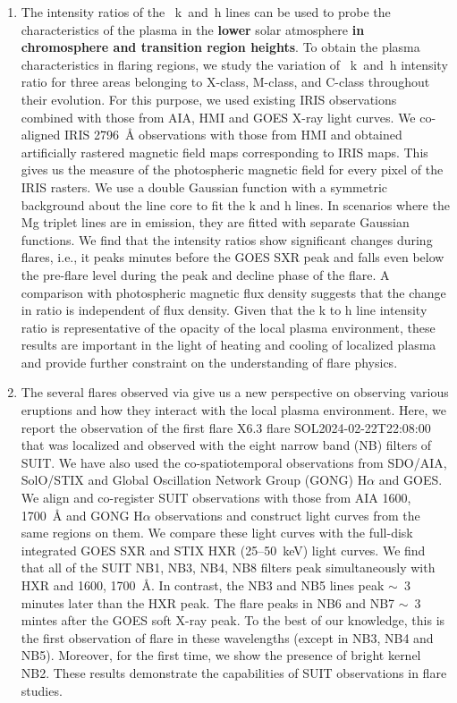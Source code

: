 \begin{enumerate}
    \item The intensity ratios of the ~k~and~h lines can be used to probe the characteristics of the plasma in the {\bf lower} solar atmosphere {\bf in chromosphere and transition region heights}. To obtain the plasma characteristics in flaring regions, we study the variation of ~k~and~h intensity ratio for three areas belonging to X-class, M-class, and C-class throughout their evolution. For this purpose, we used existing IRIS observations combined with those from AIA, HMI and GOES X-ray light curves. We co-aligned IRIS 2796~{\AA} observations with those from HMI and obtained artificially rastered magnetic field maps corresponding to IRIS maps. This gives us the measure of the photospheric magnetic field for every pixel of the IRIS rasters. We use a double Gaussian function with a symmetric background about the line core to fit the  k and h lines. In scenarios where the Mg triplet lines are in emission, they are fitted with separate Gaussian functions. We find that the intensity ratios show significant changes during flares, i.e., it peaks minutes before the GOES SXR peak and falls even below the pre-flare level during the peak and decline phase of the flare. A comparison with photospheric magnetic flux density suggests that the change in ratio is independent of flux density. Given that the  k to h line intensity ratio is representative of the opacity of the local plasma environment, these results are important in the light of heating and cooling of localized plasma and provide further constraint on the understanding of flare physics.

    \item The several flares observed via {\suit} give us a new perspective on observing various eruptions and how they interact with the local plasma environment.  Here, we report the observation of the first flare X6.3 flare SOL2024-02-22T22:08:00 that was localized and observed with the eight narrow band (NB) filters of SUIT. We have also used the co-spatiotemporal observations from SDO/AIA, SolO/STIX and Global Oscillation Network Group (GONG) H$\alpha$ and GOES. We align and co-register SUIT observations with those from AIA 1600, 1700~{\AA} and GONG H$\alpha$ observations and construct light curves from the same regions on them. We compare these light curves with the full-disk integrated GOES SXR and STIX HXR (25{--}50~keV) light curves. We find that all of the SUIT NB1, NB3, NB4, NB8 filters peak simultaneously with HXR and 1600, 1700~{\AA}. In contrast, the NB3 and NB5 lines peak $\sim$~3 minutes later than the HXR peak. The flare peaks in NB6 and NB7 $\sim$~3 mintes after the GOES soft X-ray peak. To the best of our knowledge, this is the first observation of flare in these wavelengths (except in NB3, NB4 and NB5). Moreover, for the first time, we show the presence of bright kernel NB2. These results demonstrate the capabilities of SUIT observations in flare studies.  
    
\end{enumerate}  

